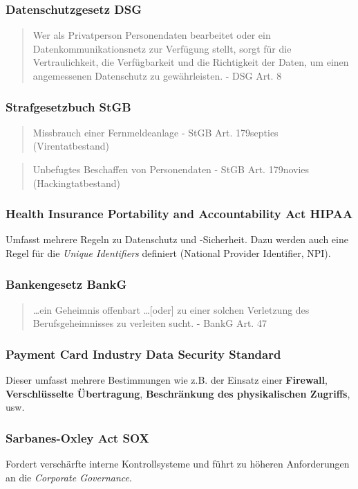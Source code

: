 \subsubsection{Datenschutzgesetz DSG}
\begin{quotation}
	Wer als Privatperson Personendaten bearbeitet oder ein Datenkommunikationsnetz zur Verfügung stellt, sorgt für die Vertraulichkeit, die Verfügbarkeit und die Richtigkeit der Daten, um einen angemessenen Datenschutz zu gewährleisten. - DSG Art. 8
\end{quotation}

\subsubsection{Strafgesetzbuch StGB}
\begin{quotation}
	Missbrauch einer Fernmeldeanlage - StGB Art. 179septies (Virentatbestand)
\end{quotation}

\begin{quotation}
	Unbefugtes Beschaffen von Personendaten - StGB Art. 179novies (Hackingtatbestand)
\end{quotation}

\subsubsection{Health Insurance Portability and Accountability Act HIPAA}
Umfasst mehrere Regeln zu Datenschutz und -Sicherheit. Dazu werden auch eine Regel für die \textit{Unique Identifiers} definiert (National Provider Identifier, NPI).

\subsubsection{Bankengesetz BankG}
\begin{quotation}
	\ldots ein Geheimnis offenbart \ldots [oder] zu einer solchen Verletzung des Berufsgeheimnisses zu verleiten sucht. - BankG Art. 47
\end{quotation}

\subsubsection{Payment Card Industry Data Security Standard}
Dieser umfasst mehrere Bestimmungen wie z.B. der Einsatz einer \textbf{Firewall}, \textbf{Verschlüsselte Übertragung}, \textbf{Beschränkung des physikalischen Zugriffs}, usw.

\subsubsection{Sarbanes-Oxley Act SOX}
Fordert verschärfte interne Kontrollsysteme und führt zu höheren Anforderungen an die \textit{Corporate Governance}.

